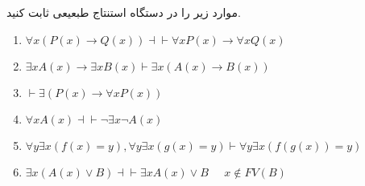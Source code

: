 
	موارد زیر را در دستگاه استنتاج طبعیعی ثابت کنید.
	\LTR
	\begin{enumerate}[label = \roman*)]
		\item 
			$\forall x (P(x) \to Q(x)) \dashv\vdash \forall x P(x) \to \forall x Q(x)$
		\item 
			$\exists x A(x) \to \exists x B(x) \vdash \exists x(A(x) \to B(x))$
		\item 
			$\vdash \exists (P(x) \to \forall x P(x))$
		\item
			$\forall x A(x) \dashv\vdash \neg \exists x \neg 	A(x)$
		\item
			$\forall y \exists x (f(x) = y), \forall y \exists x (g(x) = y) \vdash \forall y \exists x (f(g(x)) = y)$
		\item
			$\exists x(A(x) \vee B) \dashv\vdash \exists x A(x) \vee B \;\;\;\;\; x \notin FV(B)$
		 	
	\end{enumerate}
